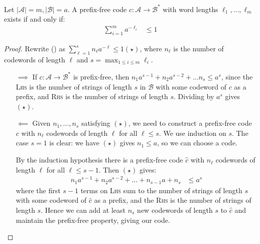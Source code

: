 \documentclass[10pt,a4paper]{article}
\begin{document}
\begin{theorem}
Let $|\mathcal{A}| = m, |\mathcal{B}| = a$. A prefix-free code $c:\mathcal{A} \to \mathcal{B}^{\ast}$ with word lengths $\ell_1, \ldots, \ell_m$ exists if and only if:
\begin{align*}
\sum_{i=1}^{m} a^{-\ell_i} &\leq 1 \tag{\ast}
\end{align*}
\end{theorem}
\begin{proof}
Rewrite (\ast) as $\sum_{\ell=1}^s n_{\ell}a^{-\ell} \leq 1 (\star)$, where $n_{\ell}$ is the number of codewords of length $\ell$ and $s = \max_{1 \leq i \leq m} \ell_i$.

\begin{itemize}
\item[$\implies$] If $c:\mathcal{A} \to \mathcal{B}^{\ast}$ is prefix-free, then $n_1 a^{s-1} + n_2 a^{s-2} + \ldots n_s \leq a^s$, since the \textsc{Lhs} is the number of strings of length $s$ in $\mathcal{B}$ with some codeword of $c$ as a prefix, and \textsc{Rhs} is the number of strings of length $s$. Dividing by $a^{s}$ gives $(\star)$.

\item[$\impliedby$] Given $n_1, \ldots, n_s$ satisfying $(\star)$, we need to construct a prefix-free code $c$ with $n_\ell$ codewords of length $\ell$ for all $\ell \leq s$. We use induction on $s$. The case $s=1$ is clear: we have $(\star)$ gives $n_1 \leq a$, so we can choose a code.

By the induction hypothesis there is a prefix-free code $\hat{c}$ with $n_{\ell}$ codewords of length $\ell$ for all $\ell \leq s-1$. Then $(\star)$ gives:
\begin{align*}
n_1 a^{s-1} + n_2 a^{s-2} + \ldots + n_{s-1}a + n_s &\leq a^s
\end{align*}
where the first $s-1$ terms on \textsc{Lhs} sum to the number of strings of length $s$ with some codeword of $\hat{c}$ as a prefix, and the \textsc{Rhs} is the number of strings of length $s$. Hence we can add at least $n_s$ new codewords of length $s$ to $\hat{c}$ and maintain the prefix-free property, giving our code.
\end{itemize}
\end{proof}
\end{document}
